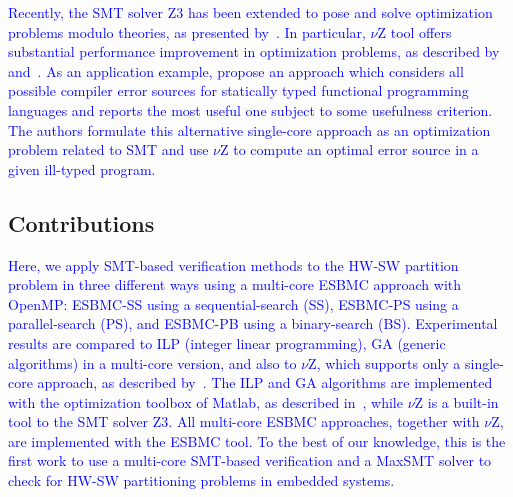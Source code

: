 \documentclass{doublecol-new}
\theoremstyle{TH}{
\newtheorem{lemma}{Lemma}
\newtheorem{theorem}[lemma]{Theorem}
\newtheorem{corrolary}[lemma]{Corrolary}
\newtheorem{conjecture}[lemma]{Conjecture}
\newtheorem{proposition}[lemma]{Proposition}
\newtheorem{claim}[lemma]{Claim}
\newtheorem{stheorem}[lemma]{Wrong Theorem}
\newtheorem{algorithm}{Algorithm}
}
\theoremstyle{THrm}{
\newtheorem{definition}{Definition}[section]
\newtheorem{question}{Question}[section]
\newtheorem{remark}{Remark}
\newtheorem{scheme}{Scheme}
}
\theoremstyle{THhit}{
\newtheorem{case}{Case}[section]
}
\begin{document}
\textcolor{blue}{Recently, the SMT solver Z3 has been extended to pose and solve optimization problems modulo theories, as presented by~\cite{Bjorner2015}. In particular, $\nu$Z tool offers substantial performance improvement in optimization problems, as described by~\cite{Bjorner2014} and~\cite{Bjorner2015}. As an application example, \cite{Pavlinovic2015} propose an approach which considers all possible compiler error sources for statically typed functional programming languages and reports the most useful one subject to some usefulness criterion. The authors formulate this alternative single-core approach as an optimization problem related to SMT and use $\nu$Z to compute an optimal error source in a given ill-typed program.}

\subsection{Contributions}

\textcolor{blue}{Here, we apply SMT-based verification methods to the HW-SW partition problem in three different ways using a multi-core ESBMC approach with OpenMP: ESBMC-SS using a sequential-search (SS), ESBMC-PS using a parallel-search (PS), and ESBMC-PB using a binary-search (BS). Experimental results are compared to ILP (integer linear programming), GA (generic algorithms) in a multi-core version, and also to $\nu$Z, which supports only a single-core approach, as described by~\cite{Bjorner2015}. The ILP and GA algorithms are implemented with the optimization toolbox of Matlab, as described in~\cite{TheMathWorks2013}, while $\nu$Z is a built-in tool to the SMT solver Z3. All multi-core ESBMC approaches, together with $\nu$Z, are implemented with the ESBMC tool. To the best of our knowledge, this is the first work to use a multi-core SMT-based verification and a MaxSMT solver to check for HW-SW partitioning problems in embedded systems.}


\end{document}
